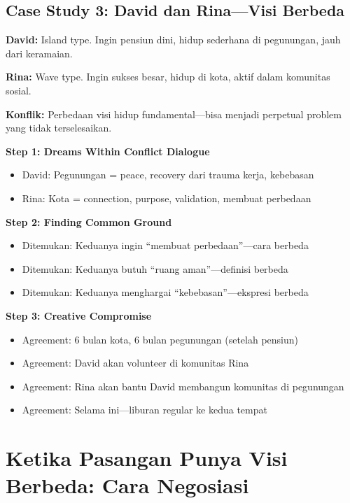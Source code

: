 \subsection{Case Study 3: David dan Rina---Visi Berbeda}

\begin{warningbox}
\textbf{David:} Island type. Ingin pensiun dini, hidup sederhana di pegunungan, jauh dari keramaian.

\textbf{Rina:} Wave type. Ingin sukses besar, hidup di kota, aktif dalam komunitas sosial.

\textbf{Konflik:} Perbedaan visi hidup fundamental---bisa menjadi perpetual problem yang tidak terselesaikan.
\end{warningbox}

\begin{praktikbox}
\textbf{Step 1: Dreams Within Conflict Dialogue}
\begin{itemize}
    \item David: Pegunungan = peace, recovery dari trauma kerja, kebebasan
    \item Rina: Kota = connection, purpose, validation, membuat perbedaan
\end{itemize}

\textbf{Step 2: Finding Common Ground}
\begin{itemize}
    \item Ditemukan: Keduanya ingin ``membuat perbedaan''---cara berbeda
    \item Ditemukan: Keduanya butuh ``ruang aman''---definisi berbeda
    \item Ditemukan: Keduanya menghargai ``kebebasan''---ekspresi berbeda
\end{itemize}

\textbf{Step 3: Creative Compromise}
\begin{itemize}
    \item Agreement: 6 bulan kota, 6 bulan pegunungan (setelah pensiun)
    \item Agreement: David akan volunteer di komunitas Rina
    \item Agreement: Rina akan bantu David membangun komunitas di pegunungan
    \item Agreement: Selama ini---liburan regular ke kedua tempat
\end{itemize}
\end{praktikbox}

\section{Ketika Pasangan Punya Visi Berbeda: Cara Negosiasi}

